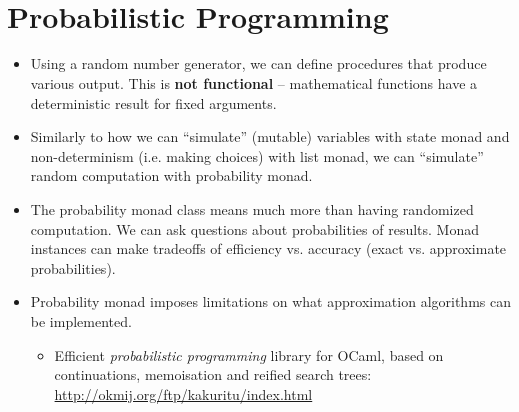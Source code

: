 \documentclass{beamer}
\newcommand{\tmem}[1]{{\em #1\/}}
\newcommand{\tmstrong}[1]{\textbf{#1}}
\begin{document}
{}{}{\hlopt{=}}{\hlendline{}}\\
{\hlstd{ \ \ \ \ \ }}{}{}{}{\hlopt{-
}}{}{\hlopt{*
}}{}{}{\hlendline{}}\\
{}{\hlopt{> }}{}{\hlopt{(}}{}{\hlopt{())}}{\hlendline{}}\\
{\hlendline{}}\\
{}{\hlendline{}}\\
{\hlendline{}}\\
{}{}{\hlopt{= }}{}{\hlopt{(}}{}{\hlopt{)}}{\hlendline{}}\\
{}{}{\hlopt{=}}{\hlendline{}}\\
{\hlstd{ \ }}{}{}{}{\hlopt{(}}{}{}{}{\hlopt{)}}{\hlendline{}}\\


\section{Probabilistic Programming}

\begin{itemize}
  \item Using a random number generator, we can define procedures that produce
  various output. This is {\tmstrong{not functional}} -- mathematical
  functions have a deterministic result for fixed arguments.
  
  \item Similarly to how we can ``simulate'' (mutable) variables with state
  monad and non-determinism (i.e. making choices) with list monad, we can
  ``simulate'' random computation with probability monad.
  
  \item The probability monad class means much more than having randomized
  computation. We can ask questions about probabilities of results. Monad
  instances can make tradeoffs of efficiency vs. accuracy (exact vs.
  approximate probabilities).
  
  \item Probability monad imposes limitations on what approximation algorithms
  can be implemented.
  \begin{itemize}
    \item Efficient {\tmem{probabilistic programming}} library for OCaml,
    based on continuations, memoisation and reified search trees:\\
    \href{http://okmij.org/ftp/kakuritu/index.html}{http://okmij.org/ftp/kakuritu/index.html}
  \end{itemize}
\end{itemize}
\end{document}
